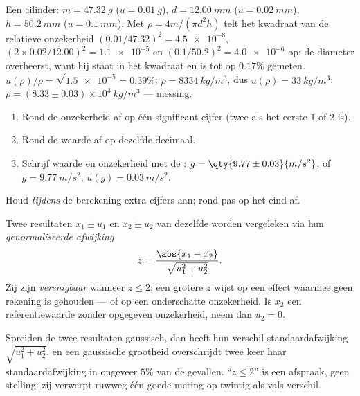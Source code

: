 \begin{example}\label{ex:b1:units-dimensions:density}
Een cilinder: $m = \qty{47.32}{g}$ ($u = \qty{0.01}{g}$),
$d = \qty{12.00}{mm}$ ($u = \qty{0.02}{mm}$), $h = \qty{50.2}{mm}$
($u = \qty{0.1}{mm}$). Met $\rho = 4m/(\pi d^2 h)$ telt het kwadraat van de
relatieve onzekerheid $(0.01/47.32)^2 = \num{4.5e-8}$,
$(2 \times 0.02/12.00)^2 = \num{1.1e-5}$ en
$(0.1/50.2)^2 = \num{4.0e-6}$ op: de diameter overheerst, want hij staat in
het kwadraat en is tot op $0.17\%$ gemeten. $u(\rho)/\rho = \sqrt{\num{1.5e-5}}
= 0.39\%$; $\rho = \qty{8334}{kg/m^3}$, dus $u(\rho) = \qty{33}{kg/m^3}$:
$\rho = (8.33 \pm 0.03)\times10^3\ \unit{kg/m^3}$ --- messing.
\end{example}

\begin{method}\label{met:b1:units-dimensions:writing}
\begin{enumerate}
  \item Rond de onzekerheid af op één significant cijfer (twee als het
        eerste $1$ of $2$ is).
  \item Rond de waarde af op dezelfde decimaal.
  \item Schrijf waarde en onzekerheid met de :
        $g = \qty{9.77\pm0.03}{m/s^2}$, of $g = \qty{9.77}{m/s^2}$,
        $u(g) = \qty{0.03}{m/s^2}$.
\end{enumerate}
Houd \emph{tijdens} de berekening extra cijfers aan; rond pas op het eind af.
\end{method}

\begin{definition}\label{def:b1:units-dimensions:zscore}
Twee resultaten $x_1 \pm u_1$ en $x_2 \pm u_2$ van dezelfde 
worden vergeleken via hun \emph{genormaliseerde afwijking}
\[
z = \frac{\abs{x_1 - x_2}}{\sqrt{u_1^2 + u_2^2}} .
\]
Zij zijn \emph{verenigbaar} wanneer $z \leq 2$; een grotere $z$ wijst op een
effect waarmee geen rekening is gehouden --- of op een onderschatte
onzekerheid. Is $x_2$ een referentiewaarde zonder opgegeven onzekerheid, neem
dan $u_2 = 0$.
\end{definition}

\begin{remark}[Waarom 2]\label{rem:b1:units-dimensions:why2}
Spreiden de twee resultaten gaussisch, dan heeft hun verschil
standaardafwijking $\sqrt{u_1^2 + u_2^2}$, en een gaussische grootheid
overschrijdt twee keer haar standaardafwijking in ongeveer $5\%$ van de
gevallen. ``$z \leq 2$'' is een afspraak, geen stelling: zij verwerpt ruwweg
één goede meting op twintig als vals verschil.
\end{remark}

